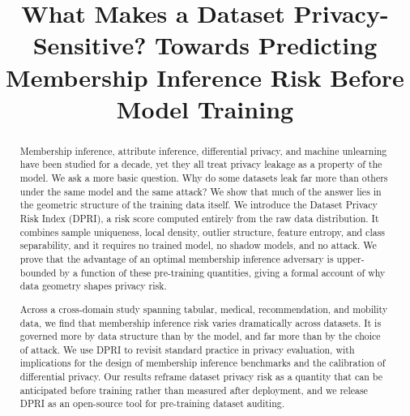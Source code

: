 \documentclass[conference,compsoc]{IEEEtran}
\begin{document}
\title{What Makes a Dataset Privacy-Sensitive? Towards Predicting Membership Inference Risk Before Model Training}

\author{
  \IEEEauthorblockN{}
}

\maketitle

\begin{abstract}
%
Membership inference, attribute inference, differential privacy, and
machine unlearning have been studied for a decade, yet they all treat
privacy leakage as a property of the model. We ask a more basic
question. Why do some datasets leak far more than others under the
same model and the same attack? We show that much of the answer lies in the geometric structure of the
training data itself. We introduce the Dataset Privacy Risk Index
(DPRI), a risk score computed entirely from the raw data distribution. It
combines sample uniqueness, local density, outlier structure, feature
entropy, and class separability, and it requires no trained model, no
shadow models, and no attack. We prove that the advantage of an optimal
membership inference adversary is upper-bounded by a function of these
pre-training quantities, giving a formal account of why data geometry
shapes privacy risk.

Across a cross-domain study spanning tabular, medical, recommendation, and
mobility data, we find that membership inference risk varies dramatically
across datasets. It is governed more by data structure than by the model,
and far more than by the choice of attack. We use DPRI to revisit
standard practice in privacy evaluation, with implications for the design
of membership inference benchmarks and the calibration of differential
privacy. Our results reframe dataset privacy risk as a quantity that can be
anticipated before training rather than measured after deployment, and we
release DPRI as an open-source tool for pre-training dataset auditing.
\end{abstract}
















\appendix

\end{document}
